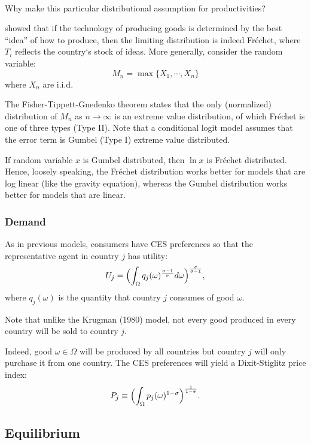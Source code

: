 \begin{note}
    \

    Why make this particular distributional assumption for productivities?

    \cite{kortum1997research} showed that if the technology of producing goods is determined by
    the best ``idea'' of how to produce, then the limiting distribution is indeed Fréchet, where
    $T_i$ reflects the country`s stock of ideas. More generally, consider the random variable:
    \[
    M_n = \max \{X_1, \cdots, X_n \}
    \]
    where $X_n$ are i.i.d.

    The Fisher-Tippett-Gnedenko theorem states that the only (normalized) distribution of
    $M_n$ as $n \to \infty $ is an extreme value distribution, of which Fréchet is one of three types (Type II).
    Note that a conditional logit model assumes that the error term is Gumbel (Type I) extreme value distributed.

    If random variable $x$ is Gumbel distributed, then $\ln{x}$ is Fréchet distributed. Hence, loosely speaking,
    the Fréchet distribution works better for models that are log linear (like the gravity equation), whereas the Gumbel
    distribution works better for models that are linear.
\end{note}

\subsubsection{Demand}

As in previous models, consumers have CES preferences so that the representative agent
in country $j$ has utility:
\[
U_j = \Bigl( \int_{\Omega} q_j(\omega)^{\frac{\sigma -1}{\sigma}} d \omega \Bigr)^{\frac{\sigma}{\sigma-1}},
\]
where $q_j(\omega)$ is the quantity that country $j$ consumes of good $\omega$.

Note that unlike the Krugman (1980)\cite{krugman1980scale} model, not every good produced in every country will be sold to country $j$.

Indeed, good $\omega \in \Omega$ will be produced by all countries but country $j$ will only purchase
it from one country. The CES preferences will yield a Dixit-Stiglitz price index:
\[
P_j \equiv \Bigl( \int_{\Omega} p_j(\omega)^{1-\sigma} \Bigr)^{\frac{1}{1-\sigma}}.
\]

\subsection{Equilibrium}

